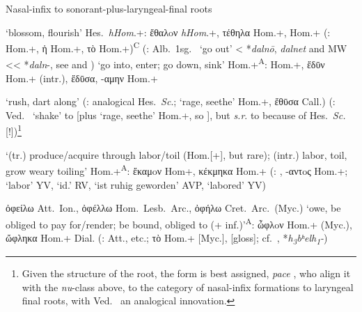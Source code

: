 \documentclass[output=paper,colorlinks,citecolor=brown]{langscibook}
\begin{document}
\begin{exe} \ex Nasal-infix to sonorant-plus-laryngeal-final roots
\begin{xlist}
    \ex {}  ‘blossom, flourish’ Hes.\ \textit{hHom}.+: ἔθαλoν \textit{hHom}.+, τέθηλα \linebreak[5] Hom.+,   Hom.+ (:   Hom.+, ἡ  Hom.+, τὸ   Hom.+)\textsuperscript{C} (: Alb.\ 1sg.\  ‘go out’ < *\textit{dalnō}, \textit{dalnet} and MW  {<}{<} *\textit{daln}-, see \citealt[257--259]{Schumacher2004} and  \citealt[968--969]{SchumacherMatzinger2013})
    \ex 
{  ‘go into, enter; go down, sink’ Hom.+\textsuperscript{A}:   Hom.+, ἔδῡν Hom.+ (intr.), ἔδῡσα, -αμην Hom.+}

\ex  {}  ‘rush, dart along’ (: analogical   Hes.\ \textit{Sc}.;   ‘rage, seethe’ Hom.+, ἔθῡσα Call.) (: Ved.\  ‘shake’ to  [plus   ‘rage, seethe’ Hom.+, so ], but  \textit{s.r}. to  because of   Hes.\ \textit{Sc.}[!])\footnote{Given the structure of the root, the form is best assigned, \textit{pace} , who align it with the \textit{nu}-class above, to the category of nasal-infix formations to laryngeal final roots, with Ved.\  an analogical innovation.}

\ex {}  ‘(tr.) produce/acquire through labor/toil (Hom.[+], but rare); (intr.) labor, toil, grow weary toiling’ Hom.+\textsuperscript{A}: ἔκαμoν Hom+, κέκμηκα Hom.+ (:  , -αντoς  Hom.+;  ‘labor’ YV,  ‘id.’ RV,  ‘ist ruhig geworden’ AVP,  ‘labored’ YV)

\ex ὀφείλω  Att.\ Ion., ὀφέλλω  Hom.\ Lesb.\ Arc., ὀφήλω  Cret.\ Arc.\ (Myc.)  ‘owe, be obliged to pay for/render; be bound, obliged to (+ inf.)’\textsuperscript{A}: ὦφλoν Hom.+ (Myc.), ὤφληκα Hom.+ Dial. (:   Att., etc.; τὸ   Hom.+ [Myc.],   [gloss]; cf.\ , *\textit{h\textsubscript{3}bʰelh\textsubscript{1}-})
\end{xlist}
\end{exe}
\end{document}
